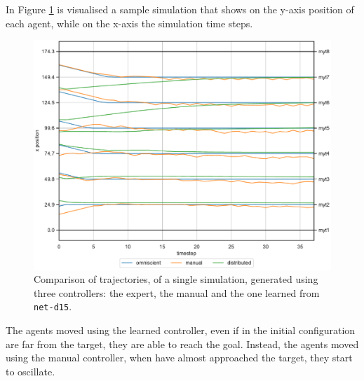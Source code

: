 In Figure \ref{fig:net-d15traj1} is visualised a sample simulation that shows on 
the y-axis position of each agent, while on the x-axis the simulation time steps. 
\begin{figure}[!htb]
	\centering
	\includegraphics[width=.7\textwidth]{contents/images/net-d15/animation-distributed}%
	\caption[Evaluation of the trajectories obtained with 8 agents.]{Comparison of 
	trajectories, of a single simulation, generated using three 
	controllers: the expert, the manual and the one learned from \texttt{net-d15}.}
	\label{fig:net-d15traj1}
\end{figure}
The agents moved using the learned controller, even if in the initial configuration 
are far from the target, they are able to reach the goal. 
Instead, the agents moved using the manual controller, when have almost 
approached the target, they start to oscillate. 


